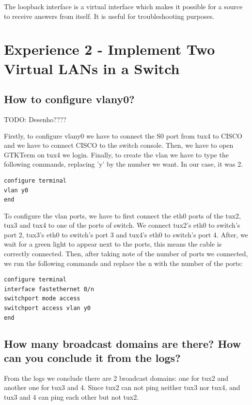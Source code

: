 \documentclass[11pt]{report}
\begin{document}
The loopback interface is a virtual interface which makes it possible for a source to receive answers from itself. It is useful for troubleshooting purposes.

\newpage

\section{Experience 2 - Implement Two Virtual LANs in a Switch}

\subsection{How to configure vlany0?}

TODO: Desenho????

Firstly, to configure vlany0 we have to connect the S0 port from tux4 to CISCO and we have to connect CISCO to the switch console. Then, we have to open GTKTerm on tux4 we login. Finally, to create the vlan we have to type the following commands, replacing 'y' by the number we want. In our case, it was 2.

\begin{verbatim}
configure terminal
vlan y0
end
\end{verbatim}

To configure the vlan ports, we have to first connect the eth0 ports of the tux2, tux3 and tux4 to one of the ports of switch. We connect tux2's eth0 to switch's port 2, tux3's eth0 to switch's port 3 and tux4's eth0 to switch's port 4. After, we wait for a green light to appear next to the ports, this means the cable is correctly connected. Then, after taking note of the number of ports we connected, we run the following commands and replace the n with the number of the ports:

\begin{verbatim}
configure terminal
interface fastethernet 0/n
switchport mode access
switchport access vlan y0
end
\end{verbatim}

\subsection{How many broadcast domains are there? How can you conclude it from
the logs?}

From the logs we conclude there are 2 broadcast domains: one for tux2 and another one for tux3 and 4. Since tux2 can not ping neither tux3 nor tux4, and tux3 and 4 can ping each other but not tux2. 
\end{document}
